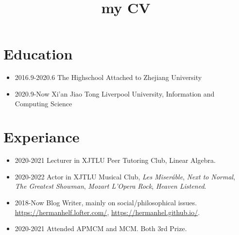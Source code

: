 \documentclass[11pt]{article}
\date{}
\title{my CV}
\begin{document}
\section{Education}
\label{sec:org6271367}
\begin{itemize}
\item 2016.9-2020.6
The Highschool Attached to Zhejiang University
\item 2020.9-Now
Xi'an Jiao Tong Liverpool University, Information and Computing Science
\end{itemize}
\section{Experiance}
\label{sec:orgfcf1dda}
\begin{itemize}
\item 2020-2021
Lecturer in XJTLU Peer Tutoring Club, Linear Algebra.
\item 2020-2022
Actor in XJTLU Musical Club, \emph{Les Miseráble}, \emph{Next to Normal}, \emph{The Greatest Showman}, \emph{Mozart L'Opera Rock}, \emph{Heaven Listened}.
\item 2018-Now
Blog Writer, mainly on social/philosophical issues.
\href{https://hermanhelf.lofter.com/}{https://hermanhelf.lofter.com/}, \url{https://hermanhel.github.io/}.
\item 2020-2021
Attended APMCM and MCM. Both 3rd Prize.
\end{itemize}
\end{document}
